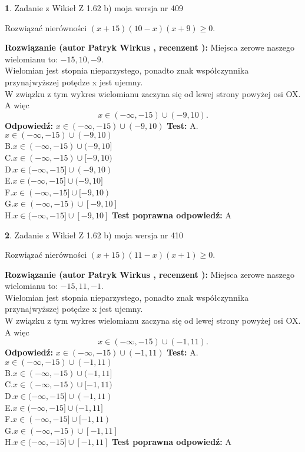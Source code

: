 \documentclass[12pt, a4paper]{article}
\theoremstyle{definition} %
\newtheorem{zad}{}
\newcommand{\zadStart}[1]{\begin{zad}#1\newline}
\newcommand{\zadStop}{\end{zad}}
\newcommand{\rozwStart}[2]{\noindent \textbf{Rozwiązanie (autor #1 , recenzent #2): }\newline}
\newcommand{\rozwStop}{\newline}
\newcommand{\odpStart}{\noindent \textbf{Odpowiedź:}\newline}
\newcommand{\odpStop}{\newline}
\newcommand{\testStart}{\noindent \textbf{Test:}\newline}
\newcommand{\testStop}{\newline}
\newcommand{\kluczStart}{\noindent \textbf{Test poprawna odpowiedź:}\newline}
\newcommand{\kluczStop}{\newline}
\begin{document}
\zadStart{Zadanie z Wikieł Z 1.62 b) moja wersja nr 409}

Rozwiązać nierówności $(x+15)(10-x)(x+9)\ge0$.
\zadStop
\rozwStart{Patryk Wirkus}{}
Miejsca zerowe naszego wielomianu to: $-15, 10, -9$.\\
Wielomian jest stopnia nieparzystego, ponadto znak współczynnika przy\linebreak najwyższej potędze x jest ujemny.\\ W związku z tym wykres wielomianu zaczyna się od lewej strony powyżej osi OX. A więc $$x \in (-\infty,-15) \cup (-9,10).$$
\rozwStop
\odpStart
$x \in (-\infty,-15) \cup (-9,10)$
\odpStop
\testStart
A.$x \in (-\infty,-15) \cup (-9,10)$\\
B.$x \in (-\infty,-15) \cup (-9,10]$\\
C.$x \in (-\infty,-15) \cup [-9,10)$\\
D.$x \in (-\infty,-15] \cup (-9,10)$\\
E.$x \in (-\infty,-15] \cup (-9,10]$\\
F.$x \in (-\infty,-15] \cup [-9,10)$\\
G.$x \in (-\infty,-15) \cup [-9,10]$\\
H.$x \in (-\infty,-15] \cup [-9,10]$
\testStop
\kluczStart
A
\kluczStop



\zadStart{Zadanie z Wikieł Z 1.62 b) moja wersja nr 410}

Rozwiązać nierówności $(x+15)(11-x)(x+1)\ge0$.
\zadStop
\rozwStart{Patryk Wirkus}{}
Miejsca zerowe naszego wielomianu to: $-15, 11, -1$.\\
Wielomian jest stopnia nieparzystego, ponadto znak współczynnika przy\linebreak najwyższej potędze x jest ujemny.\\ W związku z tym wykres wielomianu zaczyna się od lewej strony powyżej osi OX. A więc $$x \in (-\infty,-15) \cup (-1,11).$$
\rozwStop
\odpStart
$x \in (-\infty,-15) \cup (-1,11)$
\odpStop
\testStart
A.$x \in (-\infty,-15) \cup (-1,11)$\\
B.$x \in (-\infty,-15) \cup (-1,11]$\\
C.$x \in (-\infty,-15) \cup [-1,11)$\\
D.$x \in (-\infty,-15] \cup (-1,11)$\\
E.$x \in (-\infty,-15] \cup (-1,11]$\\
F.$x \in (-\infty,-15] \cup [-1,11)$\\
G.$x \in (-\infty,-15) \cup [-1,11]$\\
H.$x \in (-\infty,-15] \cup [-1,11]$
\testStop
\kluczStart
A
\kluczStop
\end{document}
